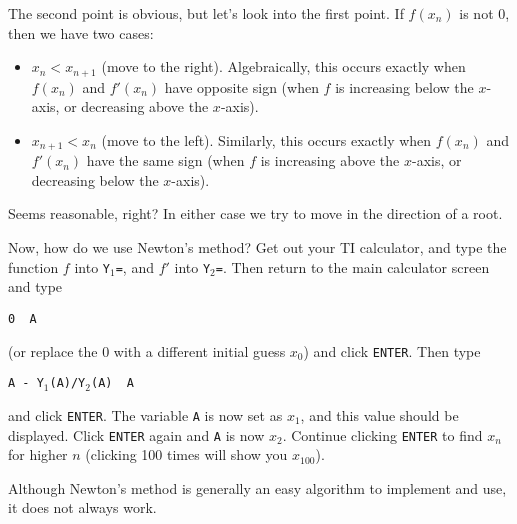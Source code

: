 The second point is obvious, but let's look into the first point. If $f(x_n)$ is not 0, then we have two cases:
\begin{itemize}
\item $x_n<x_{n+1}$ (move to the right).  Algebraically, this occurs exactly when $f(x_n)$ and $f'(x_n)$ have opposite sign (when $f$ is increasing below the $x$-axis, or decreasing above the $x$-axis). 
\item $x_{n+1}<x_n$ (move to the left). Similarly, this occurs exactly when $f(x_n)$ and $f'(x_n)$ have the same sign (when $f$ is increasing above the $x$-axis, or decreasing below the $x$-axis).
\end{itemize}

Seems reasonable, right? In either case we try to move in the direction of  a root.

Now, how do we use Newton's method? Get out your TI calculator, and type the function $f$ into \texttt{Y$_\text{1}$=}, and $f'$ into \texttt{Y$_\text{2}$=}. Then return to the main calculator screen and type
\begin{center}
\texttt{0 \MVRightarrow \ A}
\end{center}
(or replace the 0 with a different initial guess $x_0$) and click \texttt{ENTER}. Then type
\begin{center}
\texttt{A - Y$_\text{1}$(A)/Y$_\text{2}$(A) \MVRightarrow \ A}
\end{center}
and click \texttt{ENTER}. The variable \texttt{A} is now set as $x_1$, and this value should be displayed. Click \texttt{ENTER} again and \texttt{A} is now $x_2$. Continue clicking \texttt{ENTER} to find $x_n$ for higher $n$ (clicking 100 times will show you $x_{100}$).

Although Newton's method is generally an easy algorithm to implement and use, it does not always work.

